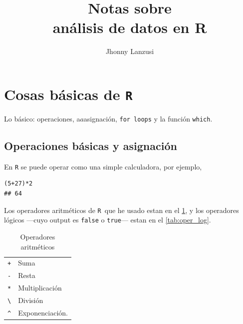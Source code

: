 \documentclass[fleqn,leqno,draft,10pt]{article}
\title{Notas sobre\\ análisis de datos en R}
\author{Jhonny Lanzusi}
\newcommand{\R}{\texttt{R}}
\begin{document}
\maketitle
\tableofcontents
{}

\section{Cosas básicas de \R}

Lo básico: operaciones, {\selectfont a}$a$asignación, \lstinline|for loops| y la función \lstinline|which|. 

\subsection{Operaciones básicas y asignación}%
\label{sub:operaciones_básicas_y_asignación}

En \R{} se puede operar como una simple calculadora, por ejemplo,%

\begin{lstlisting}
(5+27)*2
## 64
\end{lstlisting}

Los operadores aritméticos de \R\ que he usado estan en el \cref{tab:oper_arit}, y los operadores lógicos ---cuyo output es \lstinline|false| o \lstinline|true|--- estan en el \cref{tab:oper_log}.

\begin{table}\caption{Operadores aritméticos}\label{tab:oper_arit}
\begin{tabular}{rl}
	\toprule
	\texttt{+} & Suma \\
	\lstinline|-| & Resta \\
	\lstinline|*| & Multiplicación \\ 
	\lstinline|\| & División \\
	\lstinline|^| & Exponenciación. \\
	\bottomrule
\end{tabular}
\end{table}
\end{document}
